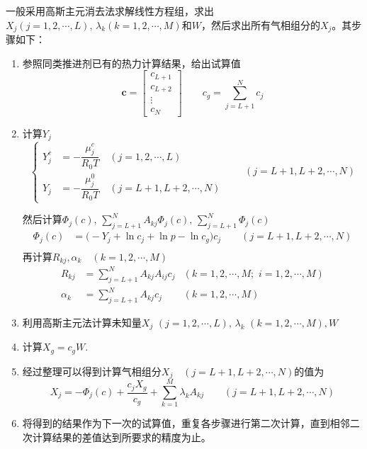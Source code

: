 一般采用高斯主元消去法求解线性方程组，求出$X_j(j = 1,2,\cdots,L),\, \lambda_k (k = 1,2,\cdots,M)$和$W$，然后求出所有气相组分的$X_j$。其步骤如下：
\vspace*{-0.5em}
\begin{enumerate}[\hspace*{1.5em}(1) ]
	\item 参照同类推进剂已有的热力计算结果，给出试算值
	\begin{equation}
		\bm{c} = 
		\begin{bmatrix}
			c_{L + 1} \\
			c_{L + 2} \\
			\vdots\\
			c_N
		\end{bmatrix}
		\qquad 
		c_g = \sum_{j = L + 1}^{N} c_j
	\end{equation}
	 
	 \item 计算$Y_j$
	 \begin{equation*}
	 	\begin{cases}
	 		Y_j^c &= - \dfrac{\mu_j^c}{R_0 T}\quad (j = 1, 2, \cdots, L)\\[0.3em]
	 		Y_j &= - \dfrac{\mu_j^0}{R_0T} \quad (j = L +1, L+2, \cdots, N)
	 	\end{cases}
 	\qquad (j = L+1, L+2 , \cdots , N)
	 \end{equation*}
 
 	然后计算$\varPhi_j(c), \, \displaystyle \sum_{j = L+1}^{N} A_{kj} \varPhi_j(c), \, \displaystyle \sum_{j = L+1}^{N} \varPhi_j(c)$
 	\begin{align*}
 		\varPhi_j(c) &=  \big(- Y_j + \ln c_j + \ln p - \ln c_g \big)c_j \qquad (j = L+1, L+2 , \cdots , N)\\
 	\end{align*}
	 再计算$R_{kj},\alpha_{k} \quad (k = 1,2,\cdots, M)$
	 \begin{equation*}
	 	\begin{aligned}
	 		\displaystyle R_{kj} &= \sum_{j = L+1}^{N} A_{kj}A_{ij}c_j &(k = 1,2,\cdots,M;\,\, i = 1,2,\cdots, M)\\[0.5em]
	 		\displaystyle \alpha_k &= \sum_{j = L+1}^{N}A_{kj}c_{j} &(k  = 1,2, \cdots, M)
	 	\end{aligned}
	 \end{equation*}
	 
	 \item 利用高斯主元法计算未知量$X_j\,\,(j=1,2,\cdots, L),\, \lambda_k\,\,(k =1,2,\cdots,M), W$
	 
	 \item 计算$X_g = c_g W$.
	 
	 \item 经过整理可以得到计算气相组分$X_j\quad (j = L+1, L+2, \cdots, N)$的值为
	 \begin{equation*}
	 	X_j = - \varPhi_j(c) + \dfrac{c_jX_g}{c_g} +  \sum_{k = 1}^{M}\lambda_k A_{kj} \qquad (j = L+1, L+2, \cdots, N)
	 \end{equation*}
 	
 	\item 将得到的结果作为下一次的试算值，重复各步骤进行第二次计算，直到相邻二次计算结果的差值达到所要求的精度为止。
\end{enumerate}

